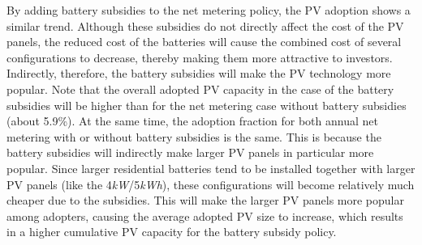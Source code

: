 By adding battery subsidies to the net metering policy, the PV adoption shows a similar trend. Although these subsidies do not directly affect the cost of the PV panels, the reduced cost of the batteries will cause the combined cost of several configurations to decrease, thereby making them more attractive to investors. Indirectly, therefore, the battery subsidies will make the PV technology more popular. Note that the overall adopted PV capacity in the case of the battery subsidies will be higher than for the net metering case without battery subsidies (about 5.9\%). At the same time, the adoption fraction for both annual net metering with or without battery subsidies is the same. This is because the battery subsidies will indirectly make larger PV panels in particular more popular. Since larger residential batteries tend to be installed together with larger PV panels (like the 4\textit{kW}/5\textit{kWh}), these configurations will become relatively much cheaper due to the subsidies. This will make the larger PV panels more popular among adopters, causing the average adopted PV size to increase, which results in a higher cumulative PV capacity for the battery subsidy policy. 
\newline \newline \noindent
